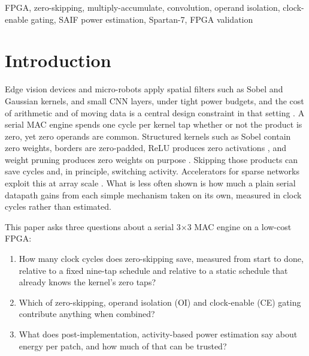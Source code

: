 \documentclass[11pt,journal,draftclsnofoot,onecolumn]{IEEEtran}
\begin{document}
\begin{IEEEkeywords}
FPGA, zero-skipping, multiply-accumulate, convolution, operand isolation, clock-enable gating, SAIF power estimation, Spartan-7, FPGA validation
\end{IEEEkeywords}

\section{Introduction}\label{sec:intro}
Edge vision devices and micro-robots apply spatial filters such as Sobel and
Gaussian kernels, and small CNN layers, under tight power budgets, and the cost of
arithmetic and of moving data is a central design constraint in that setting
\cite{horowitz2014,sze2017}. A serial MAC engine spends one cycle per kernel tap whether or not the
product is zero, yet zero operands are common. Structured kernels such as Sobel contain
zero weights, borders are zero-padded, ReLU produces zero activations
\cite{sze2017}, and weight pruning produces zero weights on purpose \cite{han2015}.
Skipping those products can save cycles and, in principle, switching activity.
Accelerators for sparse networks exploit this at array scale
\cite{eyeriss2017,eie2016,cnvlutin2016,scnn2017,nullhop2019,vestias2019}. What is less
often shown is how much a plain serial datapath gains from each simple mechanism taken
on its own, measured in clock cycles rather than estimated.

This paper asks three questions about a serial 3$\times$3 MAC engine on a low-cost
FPGA:
\begin{enumerate}
\item How many clock cycles does zero-skipping save, measured from start to done,
relative to a fixed nine-tap schedule and relative to a static schedule that
already knows the kernel's zero taps?
\item Which of zero-skipping, operand isolation (OI) \cite{munch2000} and
clock-enable (CE) gating \cite{wu2000} contribute anything when combined?
\item What does post-implementation, activity-based power estimation say about
energy per patch, and how much of that can be trusted?
\end{enumerate}
\end{document}
